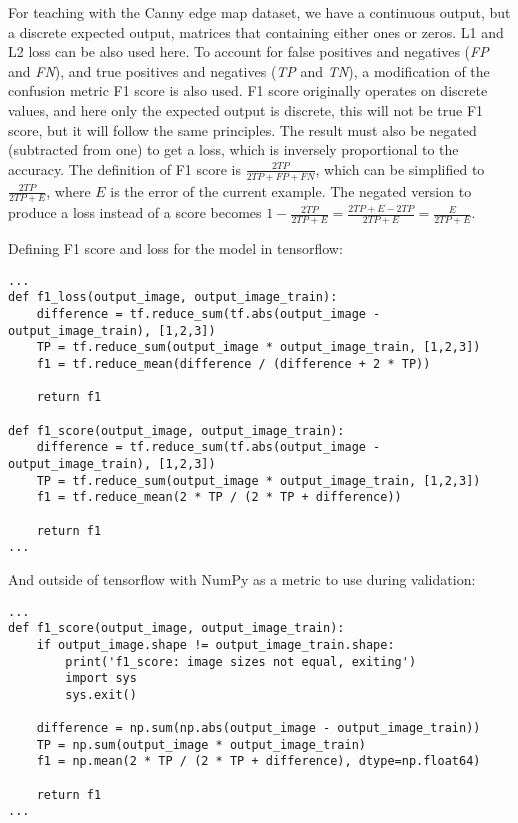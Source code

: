 \documentclass[12pt]{report}
\begin{document}
For teaching with the Canny edge map dataset, we have a continuous output, but a discrete expected output, matrices that containing either ones or zeros. L1 and L2 loss can be also used here. To account for false positives and negatives (\textit{FP} and \textit{FN}), and true positives and negatives (\textit{TP} and \textit{TN}), a modification of the confusion metric F1 score is also used. F1 score originally operates on discrete values, and here only the expected output is discrete, this will not be true F1 score, but it will follow the same principles. The result must also be negated (subtracted from one) to get a loss, which is inversely proportional to the accuracy. The definition of F1 score is $ \frac{2TP}{2TP + FP + FN} $, which can be simplified to $ \frac{2TP}{2TP + E} $, where $ E $ is the error of the current example. The negated version to produce a loss instead of a score becomes $ 1 - \frac{2TP}{2TP + E} = \frac{2TP + E - 2TP}{2TP + E} = \frac{E}{2TP + E} $.\par

Defining F1 score and loss for the model in tensorflow:
\begin{center}
	\begin{minipage}{0.95\textwidth}
		\begin{lstlisting}[title=fcn\_model.py]
...
def f1_loss(output_image, output_image_train):
	difference = tf.reduce_sum(tf.abs(output_image - output_image_train), [1,2,3])
	TP = tf.reduce_sum(output_image * output_image_train, [1,2,3])
	f1 = tf.reduce_mean(difference / (difference + 2 * TP))

	return f1

def f1_score(output_image, output_image_train):
	difference = tf.reduce_sum(tf.abs(output_image - output_image_train), [1,2,3])
	TP = tf.reduce_sum(output_image * output_image_train, [1,2,3])
	f1 = tf.reduce_mean(2 * TP / (2 * TP + difference))

	return f1
...
		\end{lstlisting}
	\end{minipage}
\end{center}
And outside of tensorflow with NumPy as a metric to use during validation:
\begin{center}
	\begin{minipage}{0.95\textwidth}
		\begin{lstlisting}[title=metrics.py]
...
def f1_score(output_image, output_image_train):
	if output_image.shape != output_image_train.shape:
		print('f1_score: image sizes not equal, exiting')
		import sys
		sys.exit()

	difference = np.sum(np.abs(output_image - output_image_train))
	TP = np.sum(output_image * output_image_train)
	f1 = np.mean(2 * TP / (2 * TP + difference), dtype=np.float64)

	return f1
...
		\end{lstlisting}
	\end{minipage}
\end{center}
\end{document}
